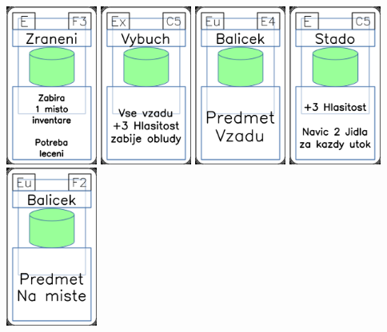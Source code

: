 \documentclass[a4paper]{article}
\begin{document}
	\includegraphics[width=3.0cm]{img-4_57}
	\includegraphics[width=3.0cm]{img-4_14}
	\includegraphics[width=3.0cm]{img-4_23}
	\includegraphics[width=3.0cm]{img-4_44}
	\includegraphics[width=3.0cm]{img-4_26}
\end{document}
